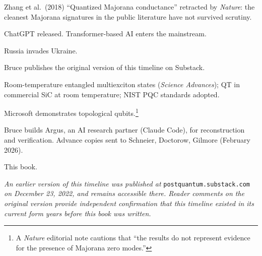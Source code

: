 \begin{description}[style=nextline, leftmargin=3.5cm, labelwidth=3cm]
\item[Mar 2021] Zhang et al.\ (2018) ``Quantized Majorana conductance'' retracted by \textit{Nature}: the cleanest Majorana signatures in the public literature have not survived scrutiny.

\item[Nov 2022] ChatGPT released. Transformer-based AI enters the mainstream.

\item[2022] Russia invades Ukraine.

\item[Dec 2022] Bruce publishes the original version of this timeline on Substack.

\item[2024] Room-temperature entangled multiexciton states (\textit{Science Advances}); QT in commercial SiC at room temperature; NIST PQC standards adopted.

\item[Feb 2025] Microsoft demonstrates topological qubits.\footnote{A \textit{Nature} editorial note cautions that ``the results do not represent evidence for the presence of Majorana zero modes.''}

\item[2025--26] Bruce builds Argus, an AI research partner (Claude Code), for reconstruction and verification. Advance copies sent to Schneier, Doctorow, Gilmore (February 2026).

\item[Feb 2026] This book.

\end{description}

\vspace{1cm}
\noindent\textit{An earlier version of this timeline was published at} \texttt{postquantum.substack.com} \textit{on December 23, 2022, and remains accessible there. Reader comments on the original version provide independent confirmation that this timeline existed in its current form years before this book was written.}
